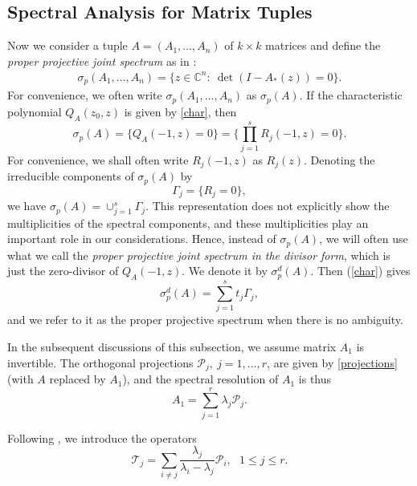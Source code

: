 \documentclass[draft, 12pt, reqno]{amsart}
\newcommand{\C}{{\mathbb C}}
\numberwithin{equation}{section}
\theoremstyle{plain}
\begin{document}
\subsection{Spectral Analysis for Matrix Tuples}
Now we consider a tuple $A=(A_1,...,A_n)$ of $k\times  k$ matrices and define the \textit{proper projective joint spectrum} as in \cite{ST}:
\begin{eqnarray}
\sigma_p(A_1,...,A_n)=\{z\in \C^n: \ \det(I-A_*(z))=0\}. \label{proper spectrum}
\end{eqnarray}
For convenience, we often write $\sigma_p(A_1,...,A_n)$ as $\sigma_p(A)$. If the characteristic polynomial $Q_A(z_0,z)$ is given by \eqref{char}, then 
\begin{equation}\label{charac} 
\sigma_p(A)=\{Q_A(-1,z)=0\}=\bigg\{\prod_{j=1}^s R_j(-1,z)=0\bigg\}.
\end{equation} 
For convenience, we shall often write $R_j(-1,z)$ as $R_j(z)$. Denoting the irreducible components of $\sigma_p(A)$ by 
\begin{equation}\label{component}
\Gamma_j=\{ R_j=0\},
\end{equation}
we have $\sigma_p(A)=\cup_{j=1}^s \Gamma_j$. This representation does not explicitly show the multiplicities of the spectral components, and these multiplicities play an important role in  our considerations. Hence, instead of $\sigma_p(A)$, we will often use what we call the \textit{proper projective joint spectrum in the divisor form}, which is just the zero-divisor of $Q_A(-1,z)$. We denote it by $\sigma_p^d(A)$. Then (\ref{char}) gives
\begin{equation}\label{divisor spectrum}
\sigma_p^d(A)=\displaystyle \sum_{j=1}^s t_j\Gamma_j,
\end{equation}
and we refer to it as the proper projective spectrum when there is no ambiguity.

In the subsequent discussions of this subsection, we  assume matrix $A_1$ is invertible. The orthogonal projections ${\mathcal P}_j, \ j=1,..., r$, are given by \eqref{projections} (with $A$ replaced by $A_1$), and the spectral resolution of $A_1$ is thus
\begin{equation}\label{spectral resolution A 1}
	A_1=\displaystyle \sum_{j=1}^r \lambda_j{\mathcal P}_j. 
\end{equation}

Following \cite{ST}, we introduce the operators
\begin{equation}\label{T}
{\mathcal T}_j=	\displaystyle \sum_{i\neq j}\frac{\lambda_j}{\lambda_i-\lambda_j}{\mathcal P}_i, \ \ \ 1\leq j\leq r.
\end{equation}
\end{document}
